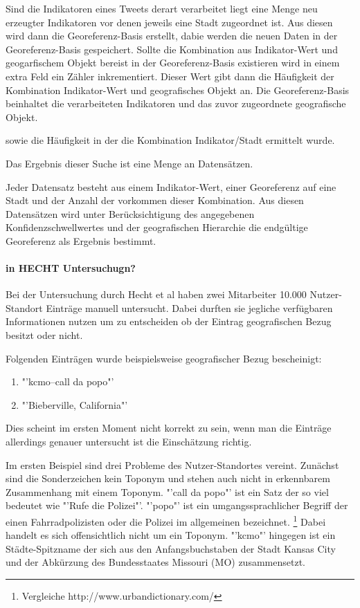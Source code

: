 	Sind die Indikatoren eines Tweets derart verarbeitet liegt eine Menge neu erzeugter Indikatoren vor denen jeweils eine Stadt zugeordnet ist.
	Aus diesen wird dann die Georeferenz-Basis erstellt, dabie werden die neuen Daten in der Georeferenz-Basis gespeichert.
	Sollte die Kombination aus Indikator-Wert und geogarfischem Objekt bereist in der Georeferenz-Basis existieren wird in einem extra Feld ein Zähler inkrementiert.
	Dieser Wert gibt dann die Häufigkeit der Kombination Indikator-Wert und geografisches Objekt an. 
	Die Georeferenz-Basis beinhaltet die verarbeiteten Indikatoren und das zuvor zugeordnete geografische Objekt.

	sowie die Häufigkeit in der die Kombination Indikator/Stadt ermittelt wurde.
	

	Das Ergebnis dieser Suche ist eine Menge an Datensätzen.
	
	Jeder Datensatz besteht aus einem Indikator-Wert, einer Georeferenz auf eine Stadt und der Anzahl der vorkommen dieser Kombination.  
	Aus diesen Datensätzen wird unter Berücksichtigung des angegebenen Konfidenzschwellwertes und der geografischen Hierarchie die endgültige Georeferenz als Ergebnis bestimmt.  



\paragraph{in HECHT Untersuchugn?}

Bei der Untersuchung durch Hecht et al haben zwei Mitarbeiter 10.000 Nutzer-Standort Einträge manuell untersucht.
						Dabei durften sie jegliche verfügbaren Informationen nutzen um zu entscheiden ob der Eintrag geografischen Bezug besitzt oder nicht. 

						Folgenden Einträgen wurde beispielsweise geografischer Bezug bescheinigt:

						\begin{enumerate}
							\item "'kcmo--call da popo"'
							\item "'Bieberville, California"'
						\end{enumerate}   

						Dies scheint im ersten Moment nicht korrekt zu sein, wenn man die Einträge allerdings genauer untersucht ist die Einschätzung richtig.

						Im ersten Beispiel sind drei Probleme des Nutzer-Standortes vereint.
						Zunächst sind die Sonderzeichen kein Toponym und stehen auch nicht in erkennbarem Zusammenhang mit einem Toponym.
						"'call da popo"' ist ein Satz der so viel bedeutet wie "'Rufe die Polizei"'. 
						"'popo"' ist ein umgangssprachlicher Begriff der einen Fahrradpolizisten oder die Polizei im allgemeinen bezeichnet. \footnote{Vergleiche http://www.urbandictionary.com/}
						Dabei handelt es sich offensichtlich nicht um ein Toponym.
						"'kcmo"' hingegen ist ein Städte-Spitzname der sich aus den Anfangsbuchstaben der Stadt Kansas City und der Abkürzung des Bundesstaates Missouri (MO) zusammensetzt.


